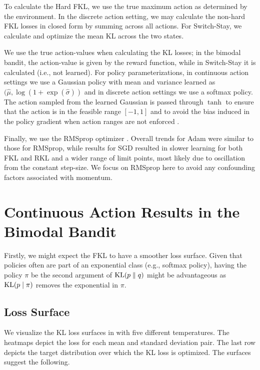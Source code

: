 \documentclass[\main/thesis.tex]{subfiles}
\begin{document}
To calculate the Hard FKL, we use the true maximum action as determined by the environment. In the discrete action setting, we may calculate the non-hard FKL losses in closed form by summing across all actions. For Switch-Stay, we calculate and optimize the mean KL across the two states.

We use the true action-values when calculating the KL losses; in the bimodal bandit, the action-value is given by the reward function, while in Switch-Stay it is calculated (i.e., not learned). For policy parameterizations, in continuous action settings we use a Gaussian policy with mean and variance learned as $(\hat{\mu}, \log(1+\exp(\hat{\sigma}))$ and in discrete action settings we use a softmax policy. The action sampled from the learned Gaussian is passed through $\tanh$ to ensure that the action is in the feasible range $[-1, 1]$ and to avoid the bias induced in the policy gradient when action ranges are not enforced \citep{chou2017improving}. 

Finally, we use the RMSprop optimizer \citep{tieleman2012lecture}. Overall trends for Adam \citep{kingma2014adam} were similar to those for RMSprop, while results for SGD resulted in slower learning for both FKL and RKL and a wider range of limit points, most likely due to oscillation from the constant step-size. We focus on RMSprop here to avoid any confounding factors associated with momentum. 


\section{Continuous Action Results in the Bimodal Bandit}
Firstly, we might expect the FKL to have a smoother loss surface. Given that policies often are part of an exponential class (e.g., softmax policy), having the policy $\pi$ be the second argument of $\mathrm{KL}(p \parallel q)$ might be advantageous as $\mathrm{KL}(p \mid \pi)$ removes the exponential in $\pi$. 

\subsection{Loss Surface}
We visualize the KL loss surfaces in  with five different temperatures. The heatmaps depict the loss for each mean and standard deviation pair. The last row depicts the target distribution over which the KL loss is optimized. The surfaces suggest the following. 
\end{document}
